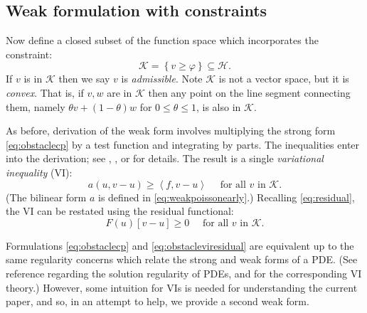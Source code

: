 \documentclass[letterpaper,final,12pt,reqno]{amsart}
\theoremstyle{claim}
\newcommand{\ip}[2]{\left<#1,#2\right>}
\numberwithin{equation}{section}
\numberwithin{figure}{section}
\numberwithin{table}{section}
\numberwithin{theorem}{section}
\begin{document}
\subsection*{Weak formulation with constraints}  Now define a closed subset of the function space which incorporates the constraint:
\begin{equation}
\mathcal{K} = \left\{v \ge \varphi\right\} \subseteq \mathcal{H}.  \label{eq:Kdefine}
\end{equation}
If $v$ is in $\mathcal{K}$ then we say $v$ is \emph{admissible}.  Note $\mathcal{K}$ is not a vector space, but it is \emph{convex}.  That is, if $v,w$ are in $\mathcal{K}$ then any point on the line segment connecting them, namely $\theta v + (1-\theta) w$ for $0 \le \theta \le 1$, is also in $\mathcal{K}$.

As before, derivation of the weak form involves multiplying the strong form \eqref{eq:obstaclecp} by a test function and integrating by parts.  The inequalities enter into the derivation; see \cite[Chapter 12]{Bueler2021}, \cite{JouvetBueler2012}, or \cite{KinderlehrerStampacchia1980} for details.  The result is a single \emph{variational inequality} (VI):
\begin{equation}
  a(u,v-u) \ge \ip{f}{v-u} \quad \text{ for all } v \text{ in } \mathcal{K}. \label{eq:obstaclevi}
\end{equation}
(The bilinear form $a$ is defined in \eqref{eq:weakpoissonearly}.)  Recalling \eqref{eq:residual}, the VI can be restated using the residual functional:
\begin{equation}
  F(u)[v-u] \ge 0 \quad \text{ for all } v \text{ in } \mathcal{K}. \label{eq:obstacleviresidual}
\end{equation}

Formulations \eqref{eq:obstaclecp} and \eqref{eq:obstacleviresidual} are equivalent up to the same regularity concerns which relate the strong and weak forms of a PDE.  (See reference \cite{Evans2010} regarding the solution regularity of PDEs, and \cite{KinderlehrerStampacchia1980} for the corresponding VI theory.)  However, some intuition for VIs is needed for understanding the current paper, and so, in an attempt to help, we provide a second weak form.
\end{document}
